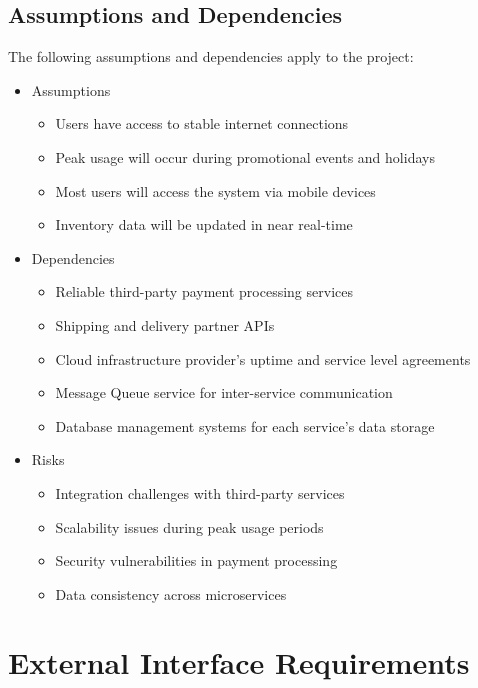 \documentclass[oneside,a4paper,12pt,explicit]{book}
\begin{document}
\section{Assumptions and Dependencies}
The following assumptions and dependencies apply to the project:

\begin{itemize}
    \item Assumptions
    \begin{itemize}
        \item Users have access to stable internet connections
        \item Peak usage will occur during promotional events and holidays
        \item Most users will access the system via mobile devices
        \item Inventory data will be updated in near real-time
    \end{itemize}
    
    \item Dependencies
    \begin{itemize}
        \item Reliable third-party payment processing services
        \item Shipping and delivery partner APIs
        \item Cloud infrastructure provider's uptime and service level agreements
        \item Message Queue service for inter-service communication
        \item Database management systems for each service's data storage
    \end{itemize}
    
    \item Risks
    \begin{itemize}
        \item Integration challenges with third-party services
        \item Scalability issues during peak usage periods
        \item Security vulnerabilities in payment processing
        \item Data consistency across microservices
    \end{itemize}
\end{itemize}

\chapter{External Interface Requirements}
\end{document}
